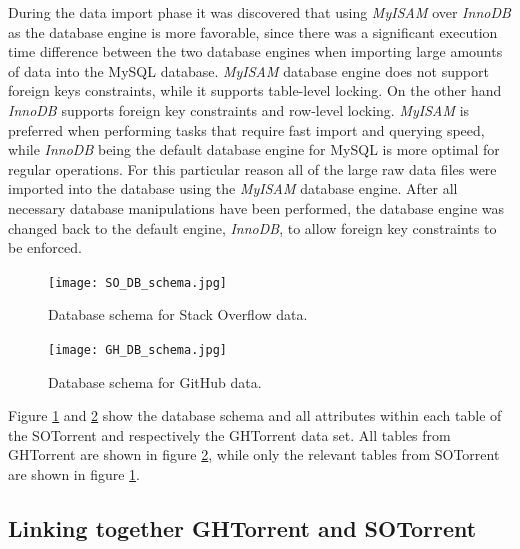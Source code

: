         During the data import phase it was discovered that using \textit{MyISAM} over \textit{InnoDB} as the database engine is more favorable, since there was a significant execution time difference between the two database engines when importing large amounts of data into the MySQL database. \textit{MyISAM} database engine does not support foreign keys constraints, while it supports table-level locking. On the other hand \textit{InnoDB} supports foreign key constraints and row-level locking. \textit{MyISAM} is preferred when performing tasks that require fast import and querying speed, while \textit{InnoDB} being the default database engine for MySQL is more optimal for regular operations. For this particular reason all of the large raw data files were imported into the database using the \textit{MyISAM} database engine. After all necessary database manipulations have been performed, the database engine was changed back to the default engine, \textit{InnoDB}, to allow foreign key constraints to be enforced. 
     
      
        \begin{figure}[!ht]
          \centering
          \texttt{[image: SO\_DB\_schema.jpg]}\\
          \caption{Database schema for Stack Overflow data.}
          \label{fig:so_schema}
        \end{figure}
        
 
        \begin{figure}[!ht]
          \centering
          \texttt{[image: GH\_DB\_schema.jpg]}\\
          \caption{Database schema for GitHub data.}
          \label{fig:gh_schema}
        \end{figure}
        
        
        Figure \ref{fig:so_schema} and \ref{fig:gh_schema} show the database schema and all attributes within each table of the SOTorrent and respectively the GHTorrent data set. All tables from GHTorrent are shown in figure \ref{fig:gh_schema}, while only the relevant tables from SOTorrent are shown in figure \ref{fig:so_schema}. 


    \subsection{Linking together GHTorrent and SOTorrent}\label{Linking_SO_GH}
    

